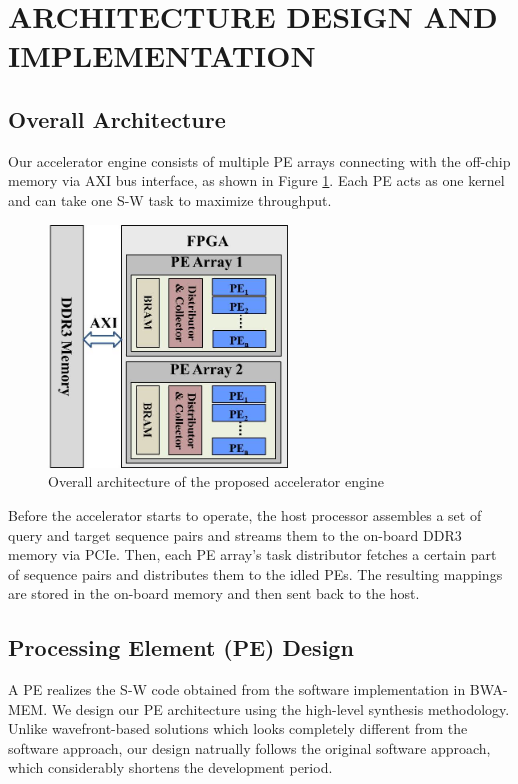 \section{ARCHITECTURE DESIGN AND IMPLEMENTATION} 
\label{sec:architecture}
\subsection{Overall Architecture}

Our accelerator engine consists of multiple PE arrays connecting with the off-chip memory via AXI bus interface, as shown in Figure \ref{fig:overall_architecture}.
Each PE acts as one kernel and can take one S-W task to maximize throughput.
\begin{figure}[!hbt]
\begin{center}
\includegraphics[width=2.5in]{Figures/Figure_Arch1.jpg}
\caption {Overall architecture of the proposed accelerator engine} \label{fig:overall_architecture} \end{center} \end{figure}
Before the accelerator starts to operate, the host processor assembles a set of query and target sequence pairs and streams them to the on-board DDR3 memory via PCIe. 
Then, each PE array's task distributor fetches a certain part of sequence pairs and distributes them to the idled PEs. 
The resulting mappings are stored in the on-board memory and then sent back to the host.
\subsection{Processing Element (PE) Design}
A PE realizes the S-W code obtained from the software implementation in BWA-MEM. 
We design our PE architecture using the high-level synthesis methodology. 
Unlike wavefront-based solutions which looks completely different from the software approach,  
our design natrually follows the original software approach, which considerably shortens the development period. 

